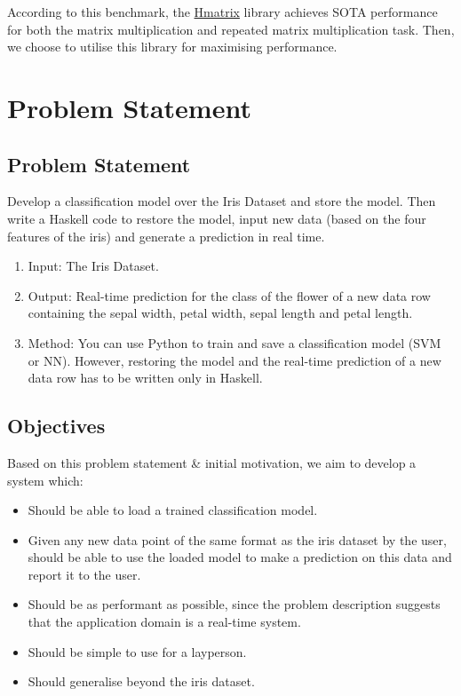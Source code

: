 \documentclass[12pt, titlepage]{article}
\begin{document}
According to this benchmark, the \href{https://hackage.haskell.org/package/hmatrix}{Hmatrix} library achieves SOTA performance for both the matrix multiplication and repeated matrix multiplication task. Then, we choose to utilise this library for maximising performance.

\section{Problem Statement}
\subsection{Problem Statement}
Develop a classification model over the Iris Dataset and store the model. Then write a Haskell code to restore the model, input new data (based on the four features of the iris) and generate a prediction in real time.
\begin{enumerate}
	\item Input: The Iris Dataset.
	\item Output: Real-time prediction for the class of the flower of a new data row containing the sepal width, petal width, sepal length and petal length.
	\item Method: You can use Python to train and save a classification model (SVM or NN). However, restoring the model and the real-time prediction of a new data row has to be written only in Haskell.
\end{enumerate}

\subsection{Objectives}
Based on this problem statement \& initial motivation, we aim to develop a system which:
\begin{itemize}
	\item Should be able to load a trained classification model.
	\item Given any new data point of the same format as the iris dataset by the user, should be able to use the loaded model to make a prediction on this data and report it to the user.
	\item Should be as performant as possible, since the problem description suggests that the application domain is a real-time system.
	\item Should be simple to use for a layperson.
	\item Should generalise beyond the iris dataset.
\end{itemize}
\end{document}
